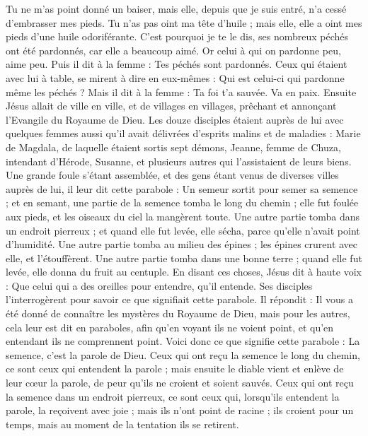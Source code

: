 \begin{multicols}{2}
Tu ne m'as point donné un baiser, mais elle, depuis que je suis entré, n'a cessé d’embrasser mes pieds.
Tu n'as pas oint ma tête d'huile ; mais elle, elle a oint mes pieds d'une huile odoriférante.
C'est pourquoi je te le dis, ses nombreux péchés ont été pardonnés, car elle a beaucoup aimé. Or celui à qui on pardonne peu, aime peu.
Puis il dit à la femme : Tes péchés sont pardonnés.
Ceux qui étaient avec lui à table, se mirent à dire en eux-mêmes : Qui est celui-ci qui pardonne même les péchés ?
Mais il dit à la femme : Ta foi t'a sauvée. Va en paix.
\VerseOne{}Ensuite Jésus allait de ville en ville, et de villages en villages, prêchant et annonçant l’Evangile du Royaume de Dieu.
Les douze disciples étaient auprès de lui avec quelques femmes aussi qu'il avait délivrées d’esprits malins et de maladies : Marie de Magdala, de laquelle étaient sortis sept démons,
Jeanne, femme de Chuza, intendant d'Hérode, Susanne, et plusieurs autres qui l'assistaient de leurs biens.
Une grande foule s’étant assemblée, et des gens étant venus de diverses villes auprès de lui, il leur dit cette parabole :
Un semeur sortit pour semer sa semence ; et en semant, une partie de la semence tomba le long du chemin ; elle fut foulée aux pieds, et les oiseaux du ciel la mangèrent toute.
Une autre partie tomba dans un endroit pierreux ; et quand elle fut levée, elle sécha, parce qu'elle n'avait point d'humidité.
Une autre partie tomba au milieu des épines ; les épines crurent avec elle, et l'étouffèrent.
Une autre partie tomba dans une bonne terre ; quand elle fut levée, elle donna du fruit au centuple. En disant ces choses, Jésus dit à haute voix : Que celui qui a des oreilles pour entendre, qu'il entende.
Ses disciples l'interrogèrent pour savoir ce que signifiait cette parabole.
Il répondit : Il vous a été donné de connaître les mystères du Royaume de Dieu, mais pour les autres, cela leur est dit en paraboles, afin qu'en voyant ils ne voient point, et qu'en entendant ils ne comprennent point.
Voici donc ce que signifie cette parabole : La semence, c'est la parole de Dieu.
Ceux qui ont reçu la semence le long du chemin, ce sont ceux qui entendent la parole ; mais ensuite le diable vient et enlève de leur cœur la parole, de peur qu’ils ne croient et soient sauvés.
Ceux qui ont reçu la semence dans un endroit pierreux, ce sont ceux qui, lorsqu’ils entendent la parole, la reçoivent avec joie ; mais ils n'ont point de racine ; ils croient pour un temps, mais au moment de la tentation ils se retirent.

\end{multicols}
